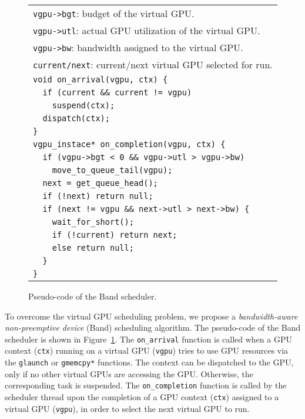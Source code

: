 \begin{figure}[t]
 \begin{center}
  \begin{tabular}{l}
   \hline
   \hline
   {\small \verb|vgpu->bgt|: budget of the virtual GPU.}\\
   {\small \verb|vgpu->utl|: actual GPU utilization of the virtual GPU.}\\
   {\small \verb|vgpu->bw|: bandwidth assigned to the virtual
   GPU.}\\
   {\small \verb|current/next|: current/next virtual GPU selected for run.}\\
   \hline
   {\small \verb|void on_arrival(vgpu, ctx) {|}\\
   {\small \verb|  if (current && current != vgpu)|}\\
   {\small \verb|    suspend(ctx);|}\\
   {\small \verb|  dispatch(ctx);|}\\
   {\small \verb|}|}\\
   {\small \verb|vgpu_instace* on_completion(vgpu, ctx) {|}\\
   {\small \verb|  if (vgpu->bgt < 0 && vgpu->utl > vgpu->bw)|}\\
   {\small \verb|    move_to_queue_tail(vgpu);|}\\
   {\small \verb|  next = get_queue_head();|}\\
   {\small \verb|  if (!next) return null;|}\\
   {\small \verb|  if (next != vgpu && next->utl > next->bw) {|}\\
   {\small \verb|    wait_for_short();|}\\
   {\small \verb|    if (!current) return next;|}\\
   {\small \verb|    else return null;|}\\
   {\small \verb|  }|}\\
   {\small \verb|}|}\\
   \hline
  \end{tabular}
  \caption{Pseudo-code of the Band scheduler.}
  \label{fig:band}
 \end{center}
 \vspace{-1.5em}
\end{figure}

To overcome the virtual GPU scheduling problem, we propose a
\textit{bandwidth-aware non-preemptive device} (Band) scheduling
algorithm.
The pseudo-code of the Band scheduler is shown in
Figure~\ref{fig:band}.
The \texttt{on\_arrival} function is called when a GPU context
(\texttt{ctx}) running on a virtual GPU (\texttt{vgpu}) tries to use GPU
resources via the \texttt{glaunch} or \texttt{gmemcpy*} functions.
The context can be dispatched to the GPU, only if no other virtual GPUs
are accessing the GPU.
Otherwise, the corresponding task is suspended.
The \texttt{on\_completion} function is called by the scheduler thread
upon the completion of a GPU context (\texttt{ctx}) assigned to a virtual
GPU (\texttt{vgpu}), in order to select the next virtual GPU to run.

